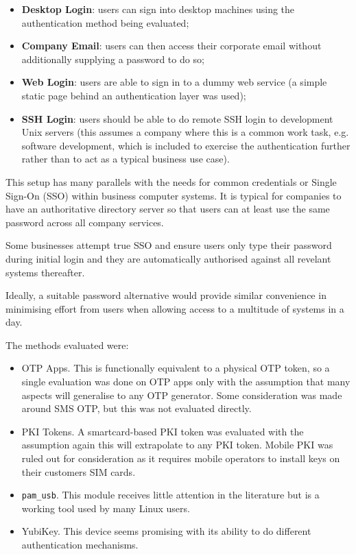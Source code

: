 \documentclass{report}
\begin{document}
\begin{itemize}
  \item \textbf{Desktop Login}: users can sign into desktop machines using the authentication method
    being evaluated;
  \item \textbf{Company Email}: users can then access their corporate email without additionally
    supplying a password to do so;
  \item \textbf{Web Login}: users are able to sign in to a dummy web service (a simple static page
    behind an authentication layer was used);
  \item \textbf{SSH Login}: users should be able to do remote SSH login to development Unix
    servers (this assumes a company where this is a common work task, e.g.
    software development, which is included to exercise the authentication
    further rather than to act as a typical business use case).
\end{itemize}

This setup has many parallels with the needs for common credentials or
Single Sign-On (SSO) within business computer systems. It is typical for
companies to have an authoritative directory server so that users
can at least use the same password across all company services.

Some businesses
attempt true SSO and ensure users only type their password during initial
login and they are automatically authorised against all revelant systems
thereafter.

Ideally, a suitable password alternative would provide similar
convenience in minimising effort from users when allowing access to a multitude
of systems in a day.

The methods evaluated were:

\begin{itemize}
  \item OTP Apps. This is functionally equivalent to a physical OTP token,
    so a single evaluation was done on OTP apps only with the assumption that
    many aspects will generalise to any OTP generator. Some consideration
    was made around SMS OTP, but this was not evaluated directly.
  \item PKI Tokens. A smartcard-based PKI token was evaluated with the
    assumption again this will extrapolate to any PKI token. Mobile PKI was
    ruled out for consideration as it requires mobile operators to install
    keys on their customers SIM cards.
  \item \texttt{pam\_usb}. This module receives little attention in the literature
    but is a working tool used by many Linux users.
  \item YubiKey. This device seems promising with its ability to do different
    authentication mechanisms.
\end{itemize}
\end{document}
